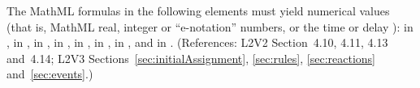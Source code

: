 The MathML formulas in the following elements must yield numerical
values (that is, MathML real, integer or ``e-notation'' numbers,
or the time or delay ):  in \KineticLaw,
 in \SpeciesReference,  in
\InitialAssignment,  in \AssignmentRule,  in
\RateRule,  in \AlgebraicRule,  in \Event
\Delay, and  in \EventAssignment.  (References: L2V2
Section~4.10, 4.11, 4.13 and~4.14; L2V3
Sections~\ref{sec:initialAssignment}, \ref{sec:rules}, \ref{sec:reactions}
and~\ref{sec:events}.)


